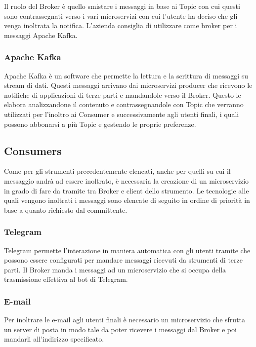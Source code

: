 		Il ruolo del Broker è quello smistare i messaggi in base ai Topic con cui questi sono contrassegnati verso i vari microservizi con cui l'utente ha deciso che gli venga inoltrata la notifica.
		L'azienda consiglia di utilizzare come broker per i messaggi Apache Kafka.
	
		\subsubsection{Apache Kafka}
		Apache Kafka è un software  che permette la lettura e la scrittura di messaggi su stream di dati.
		Questi messaggi arrivano dai microservizi producer che ricevono le notifiche di applicazioni di terze parti e mandandole verso il Broker. Questo le elabora analizzandone il contenuto e contrassegnandole con Topic che verranno utilizzati per l'inoltro ai Consumer e successivamente agli utenti finali, i quali possono abbonarsi a più Topic e gestendo le proprie preferenze.
		
	
	\subsection{Consumers}
		Come per gli strumenti precedentemente elencati, anche per quelli su cui il messaggio andrà ad essere inoltrato, è necessaria la creazione di un microservizio in grado di fare da tramite tra Broker e client dello strumento.
		Le tecnologie alle quali vengono inoltrati i messaggi sono elencate di seguito in ordine di priorità in base a quanto richiesto dal committente.
			
		\subsubsection{Telegram}
		Telegram permette l'interazione in maniera automatica con gli utenti tramite  che possono essere configurati per mandare messaggi ricevuti da strumenti di terze parti.
		Il Broker manda i messaggi ad un microservizio che si occupa della trasmissione effettiva al bot di Telegram.
		
		\subsubsection{E-mail}
		Per inoltrare le e-mail agli utenti finali è necessario un microservizio che sfrutta un server di posta in modo tale da poter ricevere i messaggi dal Broker e poi mandarli all'indirizzo specificato.
		
